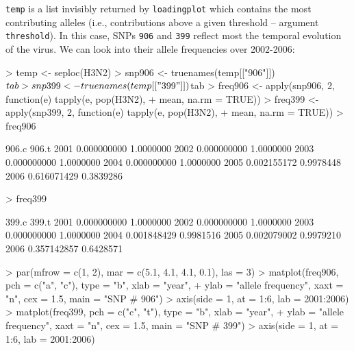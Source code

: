 \documentclass{article}
\begin{document}
\noindent \texttt{temp} is a list invisibly returned by \texttt{loadingplot} which contains the most
contributing alleles (i.e., contributions above a given threshold -- argument \texttt{threshold}).
In this case, SNPs \texttt{906} and \texttt{399} reflect most the temporal evolution of the virus.
We can look into their allele frequencies over 2002-2006:
\begin{Schunk}
\begin{Sinput}
> temp <- seploc(H3N2)
> snp906 <- truenames(temp[["906"]])$tab
> snp399 <- truenames(temp[["399"]])$tab
> freq906 <- apply(snp906, 2, function(e) tapply(e, pop(H3N2), 
+     mean, na.rm = TRUE))
> freq399 <- apply(snp399, 2, function(e) tapply(e, pop(H3N2), 
+     mean, na.rm = TRUE))
> freq906
\end{Sinput}
\begin{Soutput}
           906.c     906.t
2001 0.000000000 1.0000000
2002 0.000000000 1.0000000
2003 0.000000000 1.0000000
2004 0.000000000 1.0000000
2005 0.002155172 0.9978448
2006 0.616071429 0.3839286
\end{Soutput}
\begin{Sinput}
> freq399
\end{Sinput}
\begin{Soutput}
           399.c     399.t
2001 0.000000000 1.0000000
2002 0.000000000 1.0000000
2003 0.000000000 1.0000000
2004 0.001848429 0.9981516
2005 0.002079002 0.9979210
2006 0.357142857 0.6428571
\end{Soutput}
\begin{Sinput}
> par(mfrow = c(1, 2), mar = c(5.1, 4.1, 4.1, 0.1), las = 3)
> matplot(freq906, pch = c("a", "c"), type = "b", xlab = "year", 
+     ylab = "allele frequency", xaxt = "n", cex = 1.5, main = "SNP # 906")
> axis(side = 1, at = 1:6, lab = 2001:2006)
> matplot(freq399, pch = c("c", "t"), type = "b", xlab = "year", 
+     ylab = "allele frequency", xaxt = "n", cex = 1.5, main = "SNP # 399")
> axis(side = 1, at = 1:6, lab = 2001:2006)
\end{Sinput}
\end{Schunk}
\end{document}
